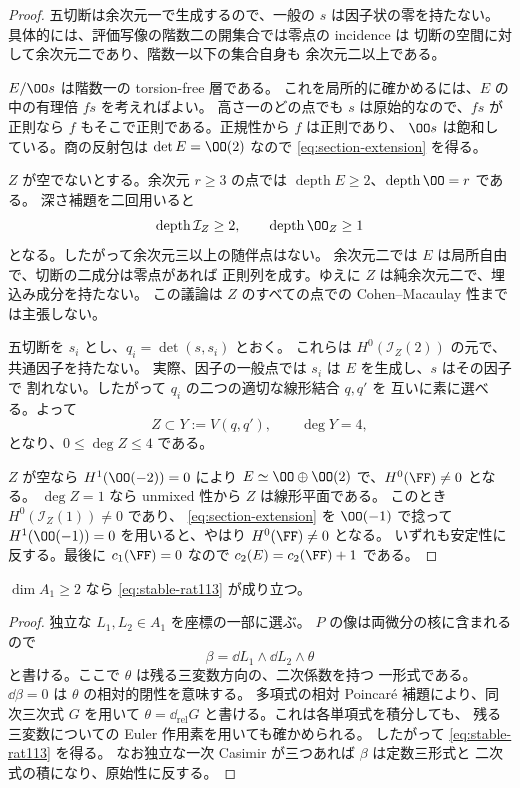 \begin{proof}
五切断は余次元一で生成するので、一般の $s$ は因子状の零を持たない。
具体的には、評価写像の階数二の開集合では零点の incidence は
切断の空間に対して余次元二であり、階数一以下の集合自身も
余次元二以上である。

$E/\OO s$ は階数一の torsion-free 層である。
これを局所的に確かめるには、$E$ の中の有理倍 $f s$ を考えればよい。
高さ一のどの点でも $s$ は原始的なので、$f s$ が正則なら
$f$ もそこで正則である。正規性から $f$ は正則であり、
$\OO s$ は飽和している。商の反射包は $\det E=\OO(2)$ なので
\eqref{eq:section-extension} を得る。

$Z$ が空でないとする。余次元 $r\geq3$ の点では
$\operatorname{depth}E\geq2$、$\operatorname{depth}\OO=r$ である。
深さ補題を二回用いると
\[
 \operatorname{depth}\mathcal I_Z\geq2,
 \qquad \operatorname{depth}\OO_Z\geq1
\]
となる。したがって余次元三以上の随伴点はない。
余次元二では $E$ は局所自由で、切断の二成分は零点があれば
正則列を成す。ゆえに $Z$ は純余次元二で、埋込み成分を持たない。
この議論は $Z$ のすべての点での Cohen--Macaulay 性までは主張しない。

五切断を $s_i$ とし、$q_i=\det(s,s_i)$ とおく。
これらは $H^0(\mathcal I_Z(2))$ の元で、共通因子を持たない。
実際、因子の一般点では $s_i$ は $E$ を生成し、$s$ はその因子で
割れない。したがって $q_i$ の二つの適切な線形結合 $q,q'$ を
互いに素に選べる。よって
\[
 Z\subset Y:=V(q,q'),\qquad \deg Y=4,
\]
となり、$0\leq\deg Z\leq4$ である。

$Z$ が空なら $H^1(\OO(-2))=0$ により
$E\simeq\OO\oplus\OO(2)$ で、$H^0(\FF)\neq0$ となる。
$\deg Z=1$ なら unmixed 性から $Z$ は線形平面である。
このとき $H^0(\mathcal I_Z(1))\neq0$ であり、
\eqref{eq:section-extension} を $\OO(-1)$ で捻って
$H^1(\OO(-1))=0$ を用いると、やはり $H^0(\FF)\neq0$ となる。
いずれも安定性に反する。最後に $c_1(\FF)=0$ なので
$c_2(E)=c_2(\FF)+1$ である。
\end{proof}

\begin{lemma}
\label{lem:two-linear-casimirs-rat113}
$\dim A_1\geq2$ なら \eqref{eq:stable-rat113} が成り立つ。
\end{lemma}

\begin{proof}
独立な $L_1,L_2\in A_1$ を座標の一部に選ぶ。
$P$ の像は両微分の核に含まれるので
\[
 \beta=\dd L_1\wedge\dd L_2\wedge\theta
\]
と書ける。ここで $\theta$ は残る三変数方向の、二次係数を持つ
一形式である。$\dd\beta=0$ は $\theta$ の相対的閉性を意味する。
多項式の相対 Poincar\'e 補題により、同次三次式 $G$ を用いて
$\theta=\dd_{\mathrm{rel}}G$ と書ける。これは各単項式を積分しても、
残る三変数についての Euler 作用素を用いても確かめられる。
したがって \eqref{eq:stable-rat113} を得る。
なお独立な一次 Casimir が三つあれば $\beta$ は定数三形式と
二次式の積になり、原始性に反する。
\end{proof}

